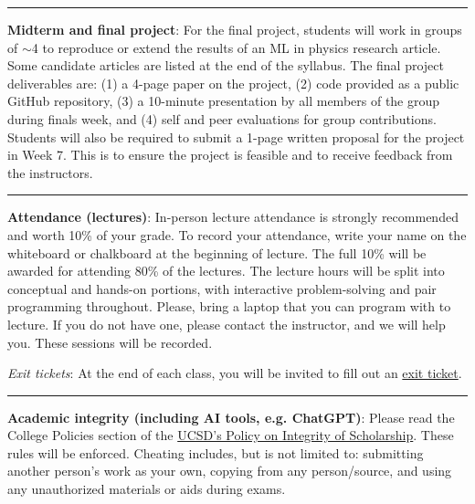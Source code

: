 \documentclass[12pt]{article}
\begin{document}
\begin{center}
	\rule{\textwidth}{0.5pt}
\end{center}

\noindent\textbf{Midterm and final project}:
For the final project, students will work in groups of $\sim$4 to reproduce or extend the results of an ML in physics research article.
Some candidate articles are listed at the end of the syllabus.
The final project deliverables are: (1) a 4-page paper on the project, (2) code provided as a public GitHub repository, (3) a 10-minute presentation by all members of the group during finals week, and (4) self and peer evaluations for group contributions.
Students will also be required to submit a 1-page written proposal for the project in Week 7.
This is to ensure the project is feasible and to receive feedback from the instructors.

\begin{center}
	\rule{\textwidth}{0.5pt}
\end{center}

\noindent\textbf{Attendance (lectures)}: In-person lecture attendance is strongly recommended and worth 10\% of your grade.
To record your attendance, write your name on the whiteboard or chalkboard at the beginning of lecture.
The full 10\% will be awarded for attending 80\% of the lectures.
The lecture hours will be split into conceptual and hands-on portions, with interactive problem-solving and pair programming throughout.
Please, bring a laptop that you can program with to lecture.
If you do not have one, please contact the instructor, and we will help you.
These sessions will be recorded.

\emph{Exit tickets}: At the end of each class, you will be invited to fill out an \href{https://forms.gle/4DmG5SjBUEM5pe6U8}{exit ticket}.


\begin{center}
	\rule{\textwidth}{0.5pt}
\end{center}

\noindent\textbf{Academic integrity (including AI tools, e.g. ChatGPT)}: Please read the College Policies section of the \href{http://senate.ucsd.edu/Operating-Procedures/Senate-Manual/Appendices/2}{UCSD's Policy on Integrity of Scholarship}.
These rules will be enforced.
Cheating includes, but is not limited to: submitting another person's work as your own, copying from any person/source, and using any unauthorized materials or aids during exams.
\end{document}

